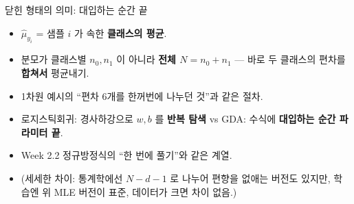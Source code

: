 \begin{frame}{닫힌 형태의 의미: 대입하는 순간 끝}
  \begin{itemize}
    \item $\hat\mu_{y_i}$ = 샘플 $i$ 가 속한 \textbf{클래스의 평균}.
    \item 분모가 클래스별 $n_0,n_1$ 이 아니라 \textbf{전체 $N=n_0+n_1$}
      --- 바로 두 클래스의 편차를 \textbf{합쳐서} 평균내기.
    \item 1차원 예시의 ``편차 6개를 한꺼번에 나누던 것''과 같은 절차.
    \item 로지스틱회귀: 경사하강으로 $w,b$ 를 \textbf{반복 탐색}
      vs GDA: 수식에 \textbf{대입하는 순간 파라미터 끝}.
    \item Week 2.2 정규방정식의 ``한 번에 풀기''와 같은 계열.
    \item {\footnotesize (세세한 차이: 통계학에선 $N{-}d{-}1$ 로 나누어
      편향을 없애는 버전도 있지만, 학습엔 위 MLE 버전이 표준,
      데이터가 크면 차이 없음.)}
  \end{itemize}
\end{frame}
